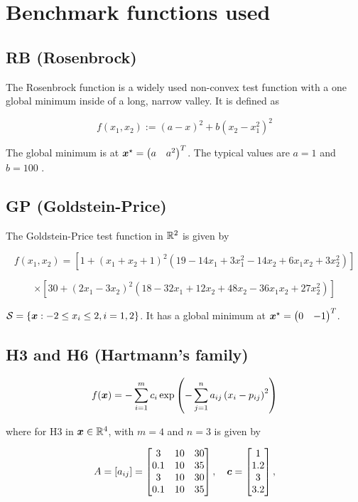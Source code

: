 \appendix
\section{Benchmark functions used}
\label{apendix:a}

\subsection{RB (Rosenbrock)}

The Rosenbrock function is a widely used non-convex test function with a one global minimum inside of a long, narrow valley.
It is defined as

$$
f\left(x_1, x_2\right):=\left(a-x\right)^2 + b\left(x_2-x_1^2\right)^2
$$

The global minimum is at $\boldsymbol{x}^\star=\begin{pmatrix} a & a^2\end{pmatrix}^T$. The typical values are $a=1$ and $b=100$ \cite{rosenbrock}.

\subsection{GP (Goldstein-Price)}

The Goldstein-Price\cite{dekkers} test function in $\mathbb{R}^2$ is given by

$$
f(x_1,x_2) = \left[ 1 + \left( x_1 + x_2 +1\right)^2
\left( 19-14x_1 + 3x_1^2 - 14x_2 + 6x_1x_2 + 3x_2^2\right)\right]
$$

$$
\times \left[ 30 + \left(2x_1-3x_2\right)^2\left(18-32x_1+12x_2+48x_2-36x_1x_2+27x_2^2\right)\right]
$$

$\mathcal{S} = \left\lbrace \boldsymbol{x} : -2 \leq x_i \leq 2, i=1,2\right\rbrace$. It has a global minimum at
$\boldsymbol{x}^\star = \begin{pmatrix} 0 & -1\end{pmatrix}^T$.

\subsection{H3 and H6 (Hartmann's family)}
$$
f(\boldsymbol{x}) = -\sum_{i=1}^m c_i \exp\left( -\sum_{j=1}^n a_{ij}\left(x_i - p_{ij}\right)^2\right)
$$

where for H3 in $\boldsymbol{x}\in\mathbb{R}^4$, with $m=4$ and $n=3$ is given by

$$
A=[a_{ij}] = \begin{bmatrix}
3 & 10 & 30\\
0.1 & 10 & 35 \\
3 & 10 & 30 \\
0.1 & 10 & 35
\end{bmatrix},
\quad
\boldsymbol{c} = \begin{bmatrix} 1 \\ 1.2 \\ 3 \\ 3.2 \end{bmatrix},
$$

